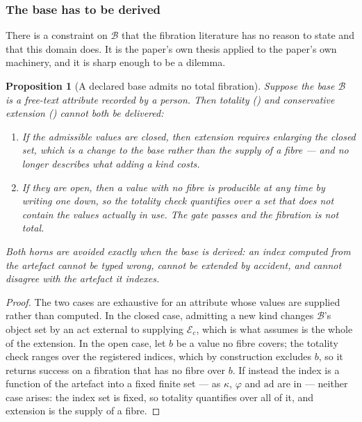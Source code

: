\documentclass[11pt,a4paper]{article}
\renewcommand{\_}{\oldunderscore\allowbreak}
\theoremstyle{plain}
\newtheorem{proposition}[theorem]{Proposition}
\theoremstyle{definition}
\theoremstyle{definition}
\theoremstyle{remark}
\begin{document}
\subsubsection*{The base has to be derived}

There is a constraint on $\mathcal{B}$ that the fibration literature has no reason to state and that this
domain does. It is the paper's own thesis applied to the paper's own machinery, and it is sharp enough to
be a dilemma.

\begin{proposition}[A declared base admits no total fibration]\label{prop:derivedbase}
Suppose the base $\mathcal{B}$ is a free-text attribute recorded by a person. Then totality
() and conservative extension () cannot both be delivered:
\begin{enumerate}[leftmargin=1.6em,itemsep=2pt]
\item If the admissible values are closed, then extension requires enlarging the closed set, which is a
      change to the base rather than the supply of a fibre --- and  no longer
      describes what adding a kind costs.
\item If they are open, then a value with no fibre is producible at any time by writing one down, so the
      totality check quantifies over a set that does not contain the values actually in use. The gate
      passes and the fibration is not total.
\end{enumerate}
Both horns are avoided exactly when the base is \emph{derived}: an index computed from the artefact
cannot be typed wrong, cannot be extended by accident, and cannot disagree with the artefact it indexes.
\end{proposition}

\begin{proof}
The two cases are exhaustive for an attribute whose values are supplied rather than computed. In the
closed case, admitting a new kind changes $\mathcal{B}$'s object set by an act external to supplying
$\mathcal{E}_c$, which is what  assumes is the whole of the extension. In the open
case, let $b$ be a value no fibre covers; the totality check ranges over the registered indices, which by
construction excludes $b$, so it returns success on a fibration that has no fibre over $b$. If instead the
index is a function of the artefact into a fixed finite set --- as $\kappa$, $\varphi$ and $\mathrm{ad}$
are in  --- neither case arises: the index set is fixed, so totality quantifies
over all of it, and extension is the supply of a fibre.
\end{proof}
\end{document}
